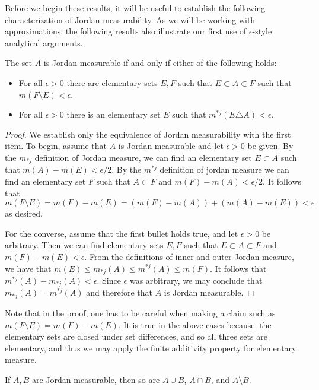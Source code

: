 Before we begin these results, it will be useful to establish the following characterization of Jordan measurability. As we will be working with approximations, the following results also illustrate our first use of $\epsilon$-style analytical arguments.

\begin{lem}
  \label{lem:jordan-equiv}
  The set $A$ is Jordan measurable if and only if either of the following holds:
  \begin{itemize}
  \item For all $\epsilon>0$ there are elementary sets $E,F$ such that $E\subset A\subset F$ such that $m(F\setminus E)<\epsilon$.
  \item For all $\epsilon>0$ there is an elementary set $E$ such that $m^{*j}(E\triangle A)<\epsilon$.
  \end{itemize}
\end{lem}

\begin{proof}
  We establish only the equivalence of Jordan measurability with the first item. To begin, assume that $A$ is Jordan measurable and let $\epsilon>0$ be given. By the $m_{*j}$ definition of Jordan measure, we can find an elementary set $E\subset A$ such that $m(A)-m(E)<\epsilon/2$. By the $m^{*j}$ definition of jordan measure we can find an elementary set $F$ such that $A\subset F$ and $m(F)-m(A)<\epsilon/2$. It follows that
\[m(F\setminus E)=m(F)-m(E)=(m(F)-m(A))+(m(A)-m(E))<\epsilon
\]
as desired.

  For the converse, assume that the first bullet holds true, and let $\epsilon>0$ be arbitrary. Then we can find elementary sets $E,F$ such that $E\subset A\subset F$ and $m(F)-m(E)<\epsilon$. From the definitions of inner and outer Jordan measure, we have that $m(E)\leq m_{*j}(A)\leq m^{*j}(A)\leq m(F)$. It follows that $m^{*j}(A)-m_{*j}(A)<\epsilon$. Since $\epsilon$ was arbitrary, we may conclude that $m_{*j}(A)=m^{*j}(A)$ and therefore that $A$ is Jordan measurable.
\end{proof}

Note that in the proof, one has to be careful when making a claim such as $m(F\setminus E)=m(F)-m(E)$. It is true in the above cases because: the elementary sets are closed under set differences, and so all three sets are elementary, and thus we may apply the finite additivity property for elementary measure.

\begin{prop}
  \label{prop:jordan-closure}
  If $A,B$ are Jordan measurable, then so are $A\cup B$, $A\cap B$, and $A\setminus B$.
\end{prop}

